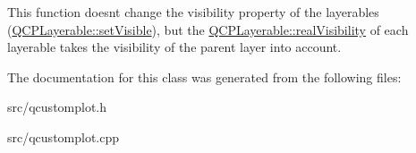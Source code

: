 This function doesn\textquotesingle{}t change the visibility property of the layerables (\hyperlink{classQCPLayerable_a3bed99ddc396b48ce3ebfdc0418744f8}{Q\+C\+P\+Layerable\+::set\+Visible}), but the \hyperlink{classQCPLayerable_a30809f7455e9794bca7b6c737622fa63}{Q\+C\+P\+Layerable\+::real\+Visibility} of each layerable takes the visibility of the parent layer into account. 

The documentation for this class was generated from the following files\+:\begin{DoxyCompactItemize}
\item 
src/qcustomplot.\+h\item 
src/qcustomplot.\+cpp\end{DoxyCompactItemize}
